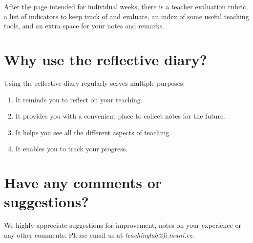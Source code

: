After the page intended for individual weeks, there is a teacher evaluation rubric, a list of indicators to keep track of and evaluate, an index of some useful teaching tools, and an extra space for your notes and remarks.

\section*{Why use the reflective diary?}

Using the reflective diary regularly serves multiple purposes:
\begin{enumerate}[topsep=0pt]
\item It reminds you to reflect on your teaching.
\item It provides you with a convenient place to collect notes for the future.
\item It helps you see all the different aspects of teaching.
\item It enables you to track your progress.
\end{enumerate}

\section*{Have any comments or suggestions?}

We highly appreciate suggestions for improvement, notes on your experience or any other comments. Please email us at \textit{teachinglab@fi.muni.cz}.
